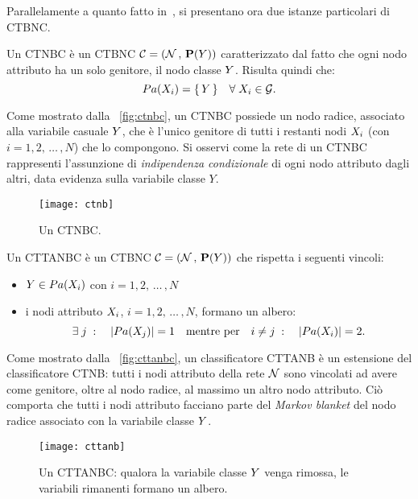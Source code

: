 Parallelamente a quanto fatto in~\citet{Langley1992}, si presentano ora due istanze particolari di \acl{CTBNC}.

\begin{definizione}\label{defn:ctnbc}
Un \acf{CTNBC} è un \acl{CTBNC} $\mathcal{C}=(\mathcal{N}\,,\,\mathbf{P}(\mathnormal{Y}))$ caratterizzato dal fatto che ogni nodo attributo ha un solo genitore, il nodo classe $\mathnormal{Y}$. Risulta quindi che:
\[
Pa(\mathnormal{X}_i)=\{\,\mathnormal{Y}\,\} \quad \forall \; \mathnormal{X}_i \in \mathcal{G}\text{.}
\]
\end{definizione}
Come mostrato dalla ~\vref{fig:ctnbc}, un \acs{CTNBC} possiede un nodo radice, associato alla variabile casuale $\mathnormal{Y}$, che è l'unico genitore di tutti i restanti nodi $\mathnormal{X}_i$ (con $i=1,2,\,\dotsc\,,N$) che lo compongono. Si osservi come la rete di un \acs{CTNBC} rappresenti l'assunzione di \emph{indipendenza condizionale} di ogni nodo attributo dagli altri, data evidenza sulla variabile classe $Y$.

\begin{figure}[H]
\centering
\texttt{[image: ctnb]}
\caption[Un \acs{CTNBC}]{Un \acf{CTNBC}.}
\label{fig:ctnbc}
\end{figure}

\begin{definizione}\label{defn:cttanbc}
Un \acf{CTTANBC} è un \acl{CTBNC} $\mathcal{C}=(\mathcal{N}\,,\,\mathbf{P}(\mathnormal{Y}))$ che rispetta i seguenti vincoli:
\begin{itemize}
    \item $\mathnormal{Y} \in Pa(\mathnormal{X}_i)$ con $i=1,2,\,\dotsc\,,N$
    \item i nodi attributo $\mathnormal{X}_i$, $i=1,2,\,\dotsc\,,N$, formano un albero:
    \[
    \exists \; j \; : \quad |Pa(\mathnormal{X}_j)|=1 \quad \text{mentre per} \quad i \neq j \; : \quad |Pa(\mathnormal{X}_i)|=2\text{.}
    \]
\end{itemize}
\end{definizione}
Come mostrato dalla ~\vref{fig:cttanbc}, un classificatore \acs{CTTANB} è un estensione del classificatore \acs{CTNB}: tutti i nodi attributo della rete $\mathcal{N}$ sono vincolati ad avere come genitore, oltre al nodo radice, al massimo un altro nodo attributo. Ciò comporta che tutti i nodi attributo facciano parte del \emph{Markov blanket} del nodo radice associato con la variabile classe $\mathnormal{Y}$.

\begin{figure}[H]
\centering
\texttt{[image: cttanb]}
\caption[Un \acs{CTTANBC}]{Un \acf{CTTANBC}: qualora la variabile classe $\mathnormal{Y}$ venga rimossa, le variabili rimanenti formano un albero.}
\label{fig:cttanbc}
\end{figure}

